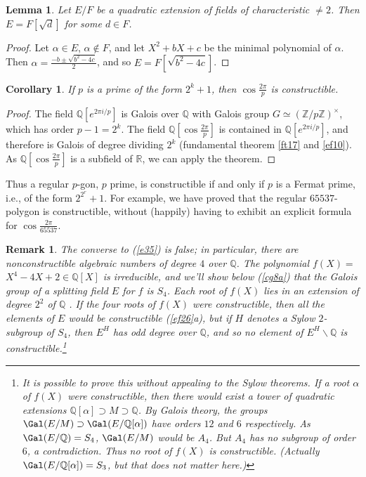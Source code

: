 \documentclass[a4paper,11pt,final,openany]{memoir}
\newtheorem{corollary}[X]{Corollary}
\newtheorem{lemma}[X]{Lemma}
\newtheorem{remark}[X]{Remark}
\theoremstyle{nonumberplain}
\newtheorem{proof}{Proof.}
\begin{document}
\begin{lemma}
\label{ft23}Let $E/F$ be a quadratic extension of fields of characteristic
$\neq2$. Then $E=F[\sqrt{d}]$ for some $d\in F$.
\end{lemma}

\begin{proof}
Let $\alpha\in E$, $\alpha\notin F$, and let $X^{2}+bX+c$ be the minimal
polynomial of $\alpha$. Then $\alpha=\frac{-b\pm\sqrt{b^{2}-4c}}{2}$, and so
$E=F[\sqrt{b^{2}-4c}]$.
\end{proof}

\begin{corollary}
\label{ft24}If $p$ is a prime of the form $2^{k}+1$, then $\cos\frac{2\pi}{p}$
is constructible.
\end{corollary}

\begin{proof}
The field $\mathbb{Q}[e^{2\pi i/p}]$ is Galois over $\mathbb{Q}$ with Galois
group $G\simeq(\mathbb{Z}/p\mathbb{Z})^{\times}$, which has order $p-1=2^{k}$.
The field $\mathbb{Q}{}[\cos\frac{2\pi}{p}]$ is contained in $\mathbb{Q}%
[e^{2\pi i/p}]$, and therefore is Galois of degree dividing $2^{k}$
(fundamental theorem \ref{ft17} and \ref{ef10}). As $\mathbb{Q}{}[\cos
\frac{2\pi}{p}]$ is a subfield of $\mathbb{R}{}$, we can apply the theorem.
\end{proof}

Thus a regular $p$-gon, $p$ prime, is constructible if and only if $p$ is a
Fermat prime, i.e., of the form $2^{2^{r}}+1$. For example, we have proved
that the regular $65537$-polygon is constructible, without (happily) having to
exhibit an explicit formula for $\cos\frac{2\pi}{65537}$.

\begin{remark}
\label{ft23r}The converse to (\ref{e35}) is false; in particular, there are
nonconstructible algebraic numbers of degree $4$ over $\mathbb{Q}{}$. The
polynomial $f(X)=$ $X^{4}-4X+2\in\mathbb{Q}{}[X]$ is irreducible, and we'll
show below (\ref{cg8a}) that the Galois group of a splitting field $E{}$ for
$f$ is $S_{4}$. Each root of $f(X)$ lies in an extension of degree $2^{2}$ of
$\mathbb{Q}{}$ . If the four roots of $f(X)$ were constructible, then all the
elements of $E$ would be constructible (\ref{ef26}a), but if $H$ denotes a
Sylow $2$-subgroup of $S_{4}$, then $E^{H}$ has odd degree over $\mathbb{Q}{}%
$, and so no element of $E^{H}\smallsetminus\mathbb{Q}{}$ is
constructible.\footnote{It is possible to prove this without appealing to the
Sylow theorems. If a root $\alpha$ of $f(X)$ were constructible, then there
would exist a tower of quadratic extensions $\mathbb{Q}[\alpha]\supset
M\supset\mathbb{Q}$. By Galois theory, the groups $\Gal(E/M)\supset
\Gal(E/\mathbb{Q}[\alpha])$ have orders $12$ and $6$ respectively. As
$\Gal(E/\mathbb{Q})=S_{4}$, $\Gal(E/M)$ would be $A_{4}$. But $A_{4}$ has no
subgroup of order $6$, a contradiction. Thus no root of $f(X)$ is
constructible. (Actually $\Gal(E/\mathbb{Q}[\alpha])=S_{3}$, but that does not
matter here.)}
\end{remark}
\end{document}

